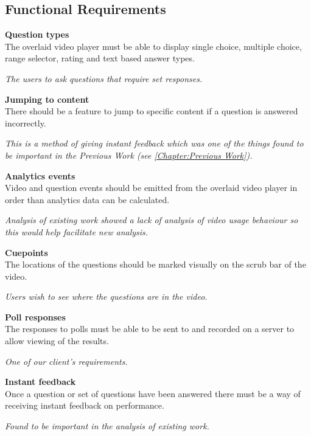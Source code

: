 \subsection{Functional Requirements}
\begin{requirement}[label=\textbf{F\arabic*}]
\item \textbf{Question types}  \label{Req:Question types} \hfill \\
The overlaid video player must be able to display single choice, multiple choice, range selector, rating and text based answer types.

\textit{The users to ask questions that require set responses.}
\item \textbf{Jumping to content} \label{Req:Jumping to content} \hfill \\ 
There should be a feature to jump to specific content if a question is answered incorrectly.

\textit{This is a method of giving instant feedback which was one of the things found to be important in the Previous Work (see \autoref{Chapter:Previous Work}).}
\item \textbf{Analytics events} \label{Req:Analytics events} \hfill \\ 
Video and question events should be emitted from the overlaid video player in order than analytics data can be calculated.

\textit{Analysis of existing work showed a lack of analysis of video usage behaviour so this would help facilitate new analysis.}
\item \textbf{Cuepoints} \label{Req:Cuepoints} \hfill \\ The locations of the questions should be marked visually on the scrub bar of the video.

\textit{Users wish to see where the questions are in the video.}
\item \textbf{Poll responses} \label{Req:Poll responses} \hfill \\ The responses to polls must be able to be sent to and recorded on a server to allow viewing of the results.

\textit{One of our client's requirements.}
\item \textbf{Instant feedback} \label{Req:Instant feedback} \hfill \\ Once a question or set of questions have been answered there must be a way of receiving instant feedback on performance.

\textit{Found to be important in the analysis of existing work.}
\end{requirement}

